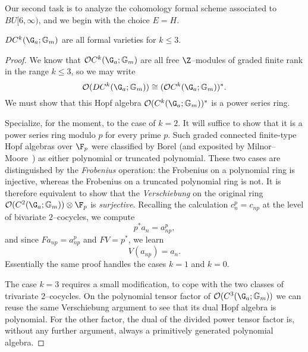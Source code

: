 Our second task is to analyze the cohomology formal scheme associated to \(BU[6, \infty)\), and we begin with the choice \(E = H\).

\begin{lemma}\label{CkGaGmAreFVars}
\(DC^k(\G_a; \Gm)\) are all formal varieties for \(k \le 3\).
\end{lemma}
\begin{proof}
We know that \(\sheaf O C^k(\G_a; \Gm)\) are all free \(\Z\)--modules of graded finite rank in the range \(k \le 3\), so we may write \[\sheaf O(D C^k(\G_a; \Gm)) \cong (\sheaf O C^k(\G_a; \Gm))^*.\]  We must show that this Hopf algebra \(\sheaf O(C^k(\G_a; \Gm))^*\) is a power series ring.

Specialize, for the moment, to the case of \(k = 2\).  It will suffice to show that it is a power series ring modulo \(p\) for every prime \(p\).  Such graded connected finite-type Hopf algebras over \(\F_p\) were classified by Borel (and exposited by Milnor--Moore~\cite[Theorem 7.11]{MilnorMoore}) as either polynomial or truncated polynomial.  These two cases are distinguished by the \textit{Frobenius} operation: the Frobenius on a polynomial ring is injective, whereas the Frobenius on a truncated polynomial ring is not.  It is therefore equivalent to show that the \emph{Verschiebung} on the original ring \(\sheaf O(C^2(\G_a; \Gm)) \otimes \F_p\) is \emph{surjective}.  Recalling the calculation \(c_n^p = c_{np}\) at the level of bivariate \(2\)--cocycles, we compute \[p^* a_n = a_{np}^p,\] and since \(F a_{np} = a_{np}^p\) and \(FV = p^*\), we learn \[V(a_{np}) = a_n.\]  Essentially the same proof handles the cases \(k = 1\) and \(k = 0\).

The case \(k = 3\) requires a small modification, to cope with the two classes of trivariate \(2\)--cocycles.  On the polynomial tensor factor of \(\sheaf O(C^3(\G_a; \Gm))\) we can reuse the same Verschiebung argument to see that its dual Hopf algebra is polynomial.  For the other factor, the dual of the divided power tensor factor is, without any further argument, always a primitively generated polynomial algebra.
\end{proof}

